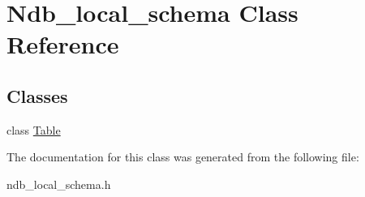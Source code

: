 \hypertarget{classNdb__local__schema}{}\section{Ndb\+\_\+local\+\_\+schema Class Reference}
\label{classNdb__local__schema}
\subsection*{Classes}
\begin{DoxyCompactItemize}
\item 
class \mbox{\hyperlink{classNdb__local__schema_1_1Table}{Table}}
\end{DoxyCompactItemize}


The documentation for this class was generated from the following file\+:\begin{DoxyCompactItemize}
\item 
ndb\+\_\+local\+\_\+schema.\+h\end{DoxyCompactItemize}
